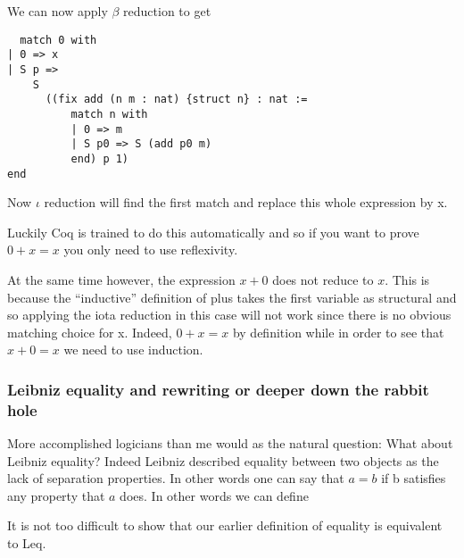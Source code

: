   We can now apply $\beta$ reduction to get
  
  
  \begin{verbatim}
  match 0 with
| 0 => x
| S p =>
    S
      ((fix add (n m : nat) {struct n} : nat :=
          match n with
          | 0 => m
          | S p0 => S (add p0 m)
          end) p 1)
end
  \end{verbatim}
  
  Now $\iota$ reduction will find the first match and replace this whole expression by x.
  
  Luckily Coq is trained to do this automatically and so if you want to prove $0+x=x$ you only need to  use reflexivity. 
  

  At the same time however,  the expression $x+0$ does not reduce to $x$. This is because the ``inductive'' definition of plus takes the first variable as structural and so applying the iota reduction in this case will not work since there is no obvious matching choice for x. Indeed, $0+x=x$ by definition while in order to see that  $x+0=x$ we need to use induction.
  
    \subsubsection{Leibniz equality and rewriting or deeper down the rabbit hole}
    
 More accomplished logicians than me would as the natural question: What about Leibniz equality? Indeed Leibniz described equality between two objects as the lack of separation properties. In other words one can say that $a=b$ if b satisfies any property that $a$ does. In other words we can define 
 
 It is not too difficult to show that our earlier definition of equality is equivalent to Leq.

